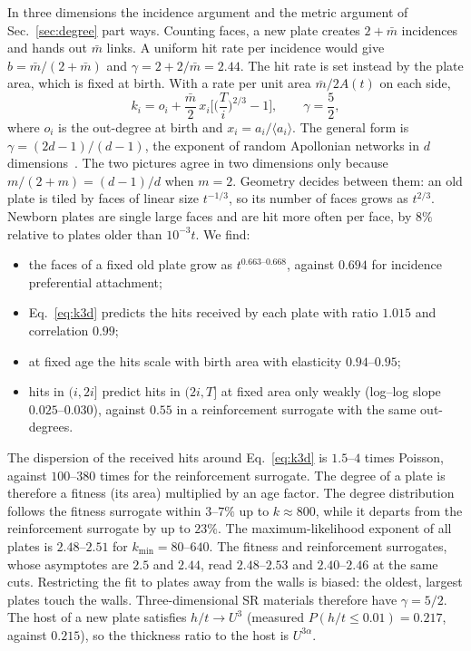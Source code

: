 In three dimensions the incidence argument and the metric argument of
Sec.~\ref{sec:degree} part ways. Counting faces, a new plate creates $2+\bar m$ incidences
and hands out $\bar m$ links. A uniform hit rate per incidence would give
$b=\bar m/(2+\bar m)$ and $\gamma=2+2/\bar m=2.44$. The hit rate is set instead by the
plate area, which is fixed at birth. With a rate per unit area $\bar m/2A(t)$ on each side,
\begin{equation}
  k_i=o_i+\frac{\bar m}{2}\,x_i\Big[\Big(\frac{T}{i}\Big)^{2/3}-1\Big],\qquad
  \gamma=\frac{5}{2},
  \label{eq:k3d}
\end{equation}
where $o_i$ is the out-degree at birth and $x_i=a_i/\langle a_i\rangle$. The general form is
$\gamma=(2d-1)/(d-1)$, the exponent of random Apollonian networks in $d$
dimensions~\cite{kolossvary2016}. The two pictures agree in two dimensions only because
$m/(2+m)=(d-1)/d$ when $m=2$. Geometry decides between them: an old plate is tiled by
faces of linear size $t^{-1/3}$, so its number of faces grows as $t^{2/3}$. Newborn plates
are single large faces and are hit more often per face, by $8\%$ relative to plates older
than $10^{-3}t$. We find:
\begin{itemize}
\item the faces of a fixed old plate grow as $t^{0.663\text{--}0.668}$, against $0.694$ for
incidence preferential attachment;
\item Eq.~\eqref{eq:k3d} predicts the hits received by each plate with ratio $1.015$ and
correlation $0.99$;
\item at fixed age the hits scale with birth area with elasticity $0.94$--$0.95$;
\item hits in $(i,2i]$ predict hits in $(2i,T]$ at fixed area only weakly (log--log slope
$0.025$--$0.030$), against $0.55$ in a reinforcement surrogate with the same out-degrees.
\end{itemize}
The dispersion of the received hits around Eq.~\eqref{eq:k3d} is $1.5$--$4$ times Poisson,
against $100$--$380$ times for the reinforcement surrogate. The degree of a plate is
therefore a fitness (its area) multiplied by an age factor. The degree distribution follows
the fitness surrogate within $3$--$7\%$ up to $k\approx800$, while it departs from the
reinforcement surrogate by up to $23\%$. The maximum-likelihood exponent of all plates is
$2.48$--$2.51$ for $k_{\min}=80$--$640$. The fitness and reinforcement surrogates, whose
asymptotes are $2.5$ and $2.44$, read $2.48$--$2.53$ and $2.40$--$2.46$ at the same cuts.
Restricting the fit to plates away from the walls is biased: the oldest, largest plates
touch the walls. Three-dimensional SR materials therefore have $\gamma=5/2$. The host of a
new plate satisfies $h/t\to U^3$ (measured $P(h/t\le0.01)=0.217$, against $0.215$), so the
thickness ratio to the host is $U^{3\alpha}$.

